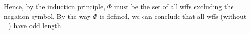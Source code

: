 \documentclass[11pt]{article}
\begin{document}
\begin{enumerate}
\begin{enumerate}
          Hence, by the induction principle, \(\varPhi\) must be the set of all wffs excluding the negation symbol.  By the way \(\varPhi\) is defined, we can conclude that all wffs (without \(\neg\)) have odd length.
      \end{enumerate}

  \end{enumerate}
\end{document}

